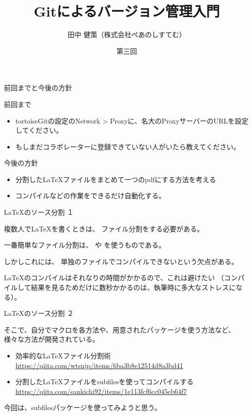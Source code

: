 \documentclass[12pt, unicode]{beamer}
\title{Gitによるバージョン管理入門}
\author{田中 健策（株式会社ぺあのしすてむ）}
\date[2019/10/18]{第三回}
\begin{document}
\frame{\maketitle}

\begin{frame}{前回までと今後の方針}

前回まで
\begin{itemize}
\item tortoiseGitの設定のNetwork > Proxyに、名大のProxyサーバーのURLを設定してください。
\item もしまだコラボレーターに登録できていない人がいたら教えてください。
\end{itemize}

今後の方針
\begin{itemize}
\item 分割したLaTeXファイルをまとめて一つのpdfにする方法を考える
\item コンパイルなどの作業をできるだけ自動化する。
\end{itemize}

\end{frame}
\begin{frame}[fragile]{\LaTeX のソース分割 １}

複数人でLaTeXを書くときは、
ファイル分割をする必要がある。

一番簡単なファイル分割は、
\verb||
や
\verb||
を使うものである。

しかしこれには、
単独のファイルでコンパイルできないという欠点がある。

LaTeXのコンパイルはそれなりの時間がかかるので、これは避けたい
（コンパイルして結果を見るためだけに数秒かかるのは、執筆時に多大なストレスになる）。

\end{frame}
\begin{frame}{\LaTeX のソース分割 ２}

そこで、自分でマクロを各方法や、用意されたパッケージを使う方法など、
様々な方法が開発されている。

\begin{itemize}
\item 効率的なLaTeXファイル分割術 \url{https://qiita.com/wtsnjp/items/6ba3b8e12514d8a3bd41}
\item 分割したLaTeXファイルをsubfilesを使ってコンパイルする　\url{https://qiita.com/sankichi92/items/1e113fcf6cc045eb64f7}
\end{itemize}

今回は、subfilesパッケージを使ってみようと思う。

\end{frame}
\end{document}
